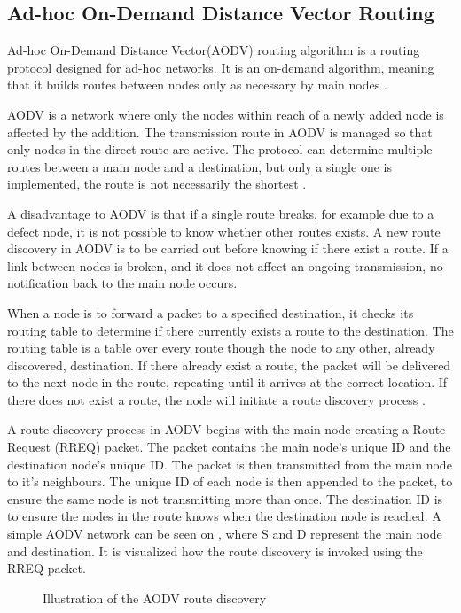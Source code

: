 \subsection{Ad-hoc On-Demand Distance Vector Routing}
Ad-hoc On-Demand Distance Vector(AODV) routing algorithm is a routing protocol designed for ad-hoc networks. 
It is an on-demand algorithm, meaning that it builds routes between nodes only as necessary by main nodes \cite{AOVD1}.

AODV is a network where only the nodes within reach of a newly added node is affected by the addition.
The transmission route in AODV is managed so that only nodes in the direct route are active.
The protocol can determine multiple routes between a main node and a destination, but only a single one is implemented, the route is not necessarily the shortest \cite{AOVD1}.

A disadvantage to AODV is that if a single route breaks, for example due to a defect node, it is not possible to know whether other routes exists.
A new route discovery in AODV is to be carried out before knowing if there exist a route.
If a link between nodes is broken, and it does not affect an ongoing transmission, no notification back to the main node occurs.

When a node is to forward a packet to a specified destination, it checks its routing table to determine if there currently exists a route to the destination.
The routing table is a table over every route though the node to any other, already discovered, destination.
If there already exist a route, the packet will be delivered to the next node in the route, repeating until it arrives at the correct location.
If there does not exist a route, the node will initiate a route discovery process \cite{AOVD1}.

A route discovery process in AODV begins with the main node creating a Route Request (RREQ) packet.
The packet contains the main node's unique ID and the destination node's unique ID.
The packet is then transmitted from the main node to it's neighbours.
The unique ID of each node is then appended to the packet, to ensure the same node is not transmitting more than once.
The destination ID is to ensure the nodes in the route knows when the destination node is reached.
A simple AODV network can be seen on , where S and D represent the main node and destination. It is visualized how the route discovery is invoked using the RREQ packet.\cite{AOVD2}

\begin{figure}[!h]
	\centering
	\caption{Illustration of the AODV route discovery}
	\label{fig:AODVfigure}
\end{figure}

